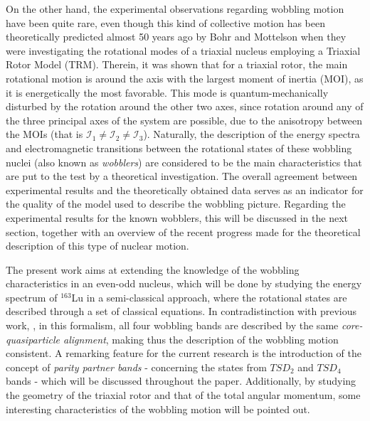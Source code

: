 \documentclass[11pt]{article}
\begin{document}
On the other hand, the experimental observations regarding wobbling motion have been quite rare, even though this kind of collective motion has been theoretically predicted almost 50 years ago by Bohr and Mottelson \cite{bohr1998nuclear} when they were investigating the rotational modes of a triaxial nucleus employing a Triaxial Rotor Model (TRM). Therein, it was shown that for a triaxial rotor, the main rotational motion is around the axis with the largest moment of inertia (MOI), as it is energetically the most favorable. This mode is quantum-mechanically disturbed by the rotation around the other two axes, since rotation around any of the three principal axes of the system are possible, due to the anisotropy between the MOIs (that is $\mathcal{I}_1\neq\mathcal{I}_2\neq\mathcal{I}_3$). Naturally, the description of the energy spectra and electromagnetic transitions between the rotational states of these wobbling nuclei (also known as \emph{wobblers}) are considered to be the main characteristics that are put to the test by a theoretical investigation. The overall agreement between experimental results and the theoretically obtained data serves as an indicator for the quality of the model used to describe the wobbling picture. Regarding the experimental results for the known wobblers, this will be discussed in the next section, together with an overview of the recent progress made for the theoretical description of this type of nuclear motion.

The present work aims at extending the knowledge of the wobbling characteristics in an even-odd nucleus, which will be done by studying the energy spectrum of $^{163}$Lu in a semi-classical approach, where the rotational states are described through a set of classical equations. In contradistinction with previous work, \cite{raduta2020towards}, in this formalism, all four wobbling bands are described by the same \emph{core-quasiparticle alignment}, making thus the description of the wobbling motion consistent. A remarking feature for the current research is the introduction of the concept of \emph{parity partner bands} - concerning the states from $TSD_2$ and $TSD_4$ bands -  which will be discussed throughout the paper. Additionally, by studying the geometry of the triaxial rotor and that of the total angular momentum, some interesting characteristics of the wobbling motion will be pointed out.
\end{document}
